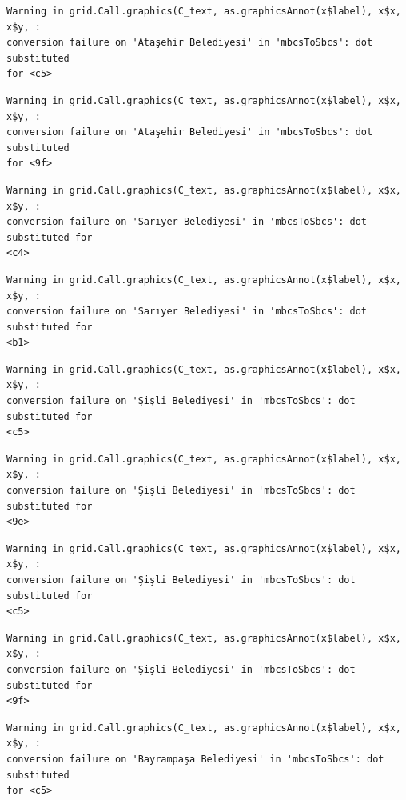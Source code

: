 \documentclass[
  11pt,
  a4paper,
  DIV=11,
  numbers=noendperiod]{scrartcl}
\begin{document}
\begin{verbatim}
Warning in grid.Call.graphics(C_text, as.graphicsAnnot(x$label), x$x, x$y, :
conversion failure on 'Ataşehir Belediyesi' in 'mbcsToSbcs': dot substituted
for <c5>
\end{verbatim}

\begin{verbatim}
Warning in grid.Call.graphics(C_text, as.graphicsAnnot(x$label), x$x, x$y, :
conversion failure on 'Ataşehir Belediyesi' in 'mbcsToSbcs': dot substituted
for <9f>
\end{verbatim}

\begin{verbatim}
Warning in grid.Call.graphics(C_text, as.graphicsAnnot(x$label), x$x, x$y, :
conversion failure on 'Sarıyer Belediyesi' in 'mbcsToSbcs': dot substituted for
<c4>
\end{verbatim}

\begin{verbatim}
Warning in grid.Call.graphics(C_text, as.graphicsAnnot(x$label), x$x, x$y, :
conversion failure on 'Sarıyer Belediyesi' in 'mbcsToSbcs': dot substituted for
<b1>
\end{verbatim}

\begin{verbatim}
Warning in grid.Call.graphics(C_text, as.graphicsAnnot(x$label), x$x, x$y, :
conversion failure on 'Şişli Belediyesi' in 'mbcsToSbcs': dot substituted for
<c5>
\end{verbatim}

\begin{verbatim}
Warning in grid.Call.graphics(C_text, as.graphicsAnnot(x$label), x$x, x$y, :
conversion failure on 'Şişli Belediyesi' in 'mbcsToSbcs': dot substituted for
<9e>
\end{verbatim}

\begin{verbatim}
Warning in grid.Call.graphics(C_text, as.graphicsAnnot(x$label), x$x, x$y, :
conversion failure on 'Şişli Belediyesi' in 'mbcsToSbcs': dot substituted for
<c5>
\end{verbatim}

\begin{verbatim}
Warning in grid.Call.graphics(C_text, as.graphicsAnnot(x$label), x$x, x$y, :
conversion failure on 'Şişli Belediyesi' in 'mbcsToSbcs': dot substituted for
<9f>
\end{verbatim}

\begin{verbatim}
Warning in grid.Call.graphics(C_text, as.graphicsAnnot(x$label), x$x, x$y, :
conversion failure on 'Bayrampaşa Belediyesi' in 'mbcsToSbcs': dot substituted
for <c5>
\end{verbatim}
\end{document}
